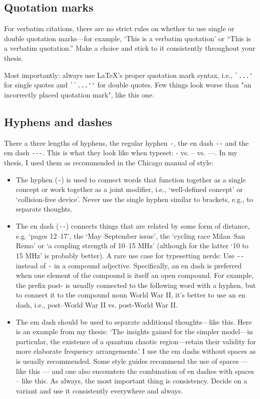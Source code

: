 \subsection{Quotation marks}
For verbatim citations, there are no strict rules on whether to use single or double quotation marks—for example, `This is a verbatim quotation' or ``This is a verbatim quotation.'' Make a choice and stick to it consistently throughout your thesis.

Most importantly: always use LaTeX's proper quotation mark syntax, i.e., \verb|`...'| for single quotes and \verb|``...''| for double quotes. Few things look worse than "an incorrectly placed quotation mark", like this one.

\subsection{Hyphens and dashes}
There a three lengths of hyphens, the regular hyphen \verb|-|, the en dash \verb|--| and the em dash \verb|---|.
This is what they look like when typeset: - vs. -- vs. ---.
In my thesis, I used them as recommended in the Chicago manual of style:
\begin{itemize}
\item The hyphen (\verb|-|) is used to connect words that function together as a single concept or work together as a joint modifier, i.e., `well-defined concept' or `collision-free device'. Never use the single hyphen similar to brackets, e.g., to separate thoughts.
\item The en dash (\verb|--|) connects things that are related by some form of distance, e.g. `pages 12--17', the `May--September issue', the `cycling race Milan--San Remo' or `a coupling strength of 10--15 MHz' (although for the latter `10 to 15 MHz' is probably better). A rare use case for typesetting nerds: Use \verb|--| instead of \verb|-| in a compound adjective. Specifically, an en dash is preferred when one element of the compound is itself an open compound. For example, the prefix post- is usually connected to the following word with a hyphen, but to connect it to the compound noun World War II, it's better to use an en dash, i.e., post--World War II vs. post-World War II.
\item The em dash should be used to separate additional thoughts---like this. Here is an example from my thesis: `The insights gained for the simpler model---in particular, the existence of a quantum chaotic region---retain their validity for more elaborate frequency arrangements.' I use the em dashs without spaces as is usually recommended. Some style guides recommend the use of spaces --- like this --- and one also encounters the combination of en dashes with spaces -- like this. As always, the most important thing is consistency. Decide on a variant and use it consistently everywhere and always.
\end{itemize}

